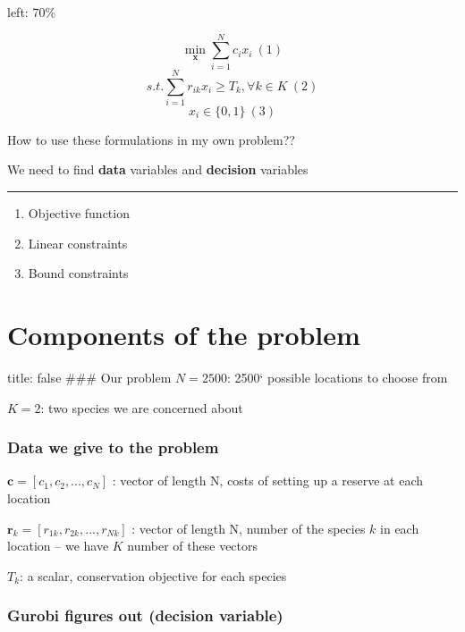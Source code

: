 \documentclass[
]{article}
\providecommand{\tightlist}{%
  \setlength{\itemsep}{0pt}\setlength{\parskip}{0pt}}
\begin{document}
left: 70\%

\[ \min_\mathbf{x} \sum^N_{i=1} c_i x_i \: (1) \]
\[ s.t. \sum_{i=1}^N r_{ik} x_i \geq T_k, \forall k \in K \: (2) \]
\[ x_i \in \{0,1\} \: (3) \]

How to use these formulations in my own problem??

We need to find \textbf{data} variables and \textbf{decision} variables

\begin{center}\rule{0.5\linewidth}{0.5pt}\end{center}

\begin{enumerate}
\def\labelenumi{\arabic{enumi}.}
\tightlist
\item
  Objective function
\item
  Linear constraints
\item
  Bound constraints
\end{enumerate}

\hypertarget{components-of-the-problem}{%
\section{Components of the problem}\label{components-of-the-problem}}

title: false \#\#\# Our problem \(N= 2500\): 2500` possible locations to
choose from

\(K=2\): two species we are concerned about

\hypertarget{data-we-give-to-the-problem}{%
\subsubsection{Data we give to the
problem}\label{data-we-give-to-the-problem}}

\(\mathbf{c} = [c_1, c_2, ..., c_N]\) : vector of length N, costs of
setting up a reserve at each location

\(\mathbf{r}_k = [r_{1k}, r_{2k}, ..., r_{Nk}]\) : vector of length N,
number of the species \(k\) in each location -- we have \(K\) number of
these vectors

\(T_k\): a scalar, conservation objective for each species

\hypertarget{gurobi-figures-out-decision-variable}{%
\subsubsection{Gurobi figures out (decision
variable)}\label{gurobi-figures-out-decision-variable}}
\end{document}
